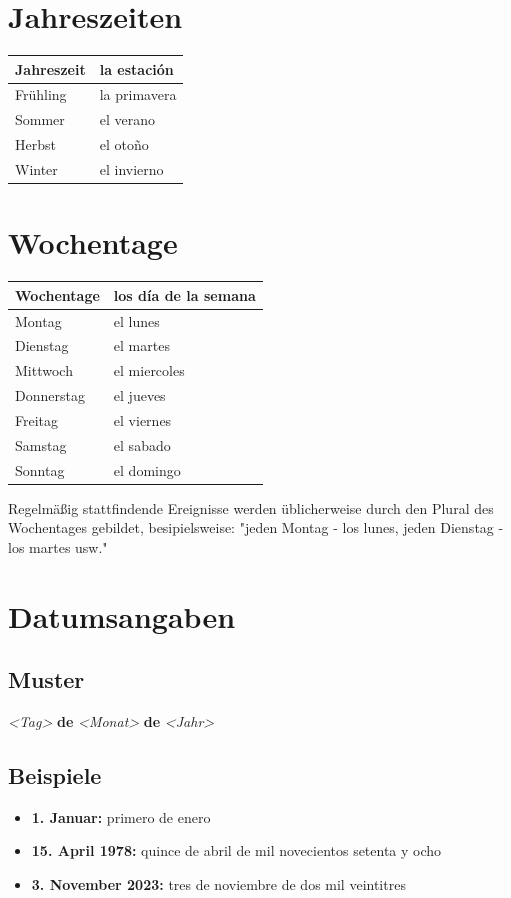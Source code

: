 \documentclass[10pt,spanish]{report}
\begin{document}
\section*{Jahreszeiten}
\begin{longtable}{p{} | p{}} 
\textbf{Jahreszeit}     & \textbf{la estación}                                       \\ \hline
\hline
\endhead %
Frühling & la primavera \\
Sommer & el verano \\
Herbst & el oto\~{n}o \\
Winter & el invierno \\
\end{longtable}

\newpage

\section*{Wochentage}
\begin{longtable}{p{} | p{}} 
\textbf{Wochentage}     & \textbf{los día de la semana}                                       \\ \hline
\hline
\endhead %
Montag & el lunes \\
Dienstag & el martes\\
Mittwoch & el miercoles \\
Donnerstag & el jueves \\
Freitag & el viernes\\
Samstag & el sabado \\
Sonntag & el domingo \\
\end{longtable}
Regelmäßig stattfindende Ereignisse werden üblicherweise durch den Plural des Wochentages gebildet, besipielsweise: "jeden Montag - los lunes, jeden Dienstag - los martes usw."

\section*{Datumsangaben}
\subsection*{Muster}
\textit{<Tag>} \textbf{de} \textit{<Monat>} \textbf{de} \textit{<Jahr> }

\subsection*{Beispiele}
\begin{itemize}
  \item \textbf{1. Januar: } primero de enero
  \item \textbf{15. April 1978: } quince de abril de mil novecientos setenta y ocho
  \item \textbf{3. November 2023: } tres de noviembre de dos mil veintitres
\end{itemize}
\end{document}
